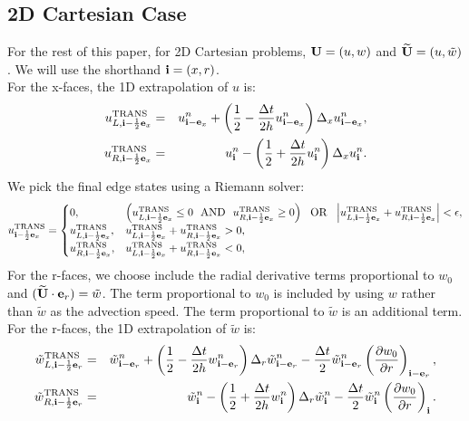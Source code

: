 \documentclass[11pt]{article}
\def\half  {\frac{1}{2}}
\def\dt    {\Delta t}
\def\trans {\rm TRANS}
\def\eb    {{\bf e}}
\def\ib    {{\bf i}}
\def\Ub    {{\bf U}}
\def\Ubt   {\widetilde{\bf U}}
\def\wt    {\tilde{w}}
\begin{document}
\subsection{2D Cartesian Case}
For the rest of this paper, for 2D Cartesian problems, $\Ub = (u,w)$ and $\Ubt = (u,\wt)$.  We will use the shorthand $\ib = (x,r)$.\\

For the x-faces, the 1D extrapolation of $u$ is:
\begin{eqnarray}
u_{L,\ib-\half\eb_x}^{\trans} &=& u_{\ib-\eb_x}^n + \left(\half - \frac{\dt}{2h}u_{\ib-\eb_x}^n\right)\Delta_x u_{\ib-\eb_x}^n, \\
u_{R,\ib-\half\eb_x}^{\trans} &=& u_{\ib}^n - \left(\half + \frac{\dt}{2h}u_{\ib}^n\right)\Delta_x u_{\ib}^n.
\end{eqnarray}
We pick the final edge states using a Riemann solver:
\begin{equation}
u^{\trans}_{\ib-\half\eb_x} =
\begin{cases}
0, & \left(u_{L,\ib-\half\eb_x}^{\trans} \le 0 ~~ {\rm AND} ~~ u_{R,\ib-\half\eb_x}^{\trans} \ge 0\right) ~~ {\rm OR} ~~ \left|u_{L,\ib-\half\eb_x}^{\trans} + u_{R,\ib-\half\eb_x}^{\trans}\right| < \epsilon, \\
u_{L,\ib-\half\eb_x}^{\trans}, & u_{L,\ib-\half\eb_x}^{\trans} + u_{R,\ib-\half\eb_x}^{\trans} > 0, \\
u_{R,\ib-\half\eb_x}^{\trans}, & u_{L,\ib-\half\eb_x}^{\trans} + u_{R,\ib-\half\eb_x}^{\trans} < 0, \\
\end{cases}
\end{equation}
For the r-faces, we choose include the radial derivative terms proportional to $w_0$ and $(\Ubt\cdot\eb_r) = \wt$.  The term proportional to $w_0$ is included by using $w$ rather than $\wt$ as the advection speed.  The term proportional to $\wt$ is an additional term.  For the r-faces, the 1D extrapolation of $\wt$ is:
\begin{eqnarray}
\wt_{L,\ib-\half\eb_r}^{\trans} &=& \wt_{\ib-\eb_r}^n + \left(\half - \frac{\dt}{2h}w_{\ib-\eb_r}^n\right)\Delta_r \wt_{\ib-\eb_r}^n - \frac{\dt}{2}\wt_{\ib-\eb_r}^n\left(\frac{\partial w_0}{\partial r}\right)_{\ib-\eb_r},\label{Radial utrans_L} \\
\wt_{R,\ib-\half\eb_r}^{\trans} &=& \wt_{\ib}^n - \left(\half + \frac{\dt}{2h}w_{\ib}^n\right)\Delta_r \wt_{\ib}^n - \frac{\dt}{2}\wt_{\ib}^n\left(\frac{\partial w_0}{\partial r}\right)_{\ib}.\label{Radial utrans_R}
\end{eqnarray}
\end{document}
